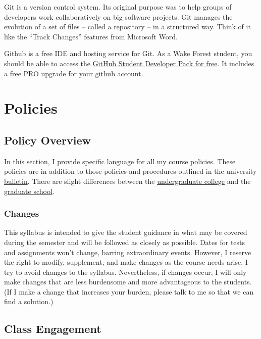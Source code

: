 Git is a version control system. Its original purpose was to help groups of developers work collaboratively on big software projects. Git manages the evolution of a set of files -- called a repository -- in a structured way. Think of it like the ``Track Changes'' features from Microsoft Word.

Github is a free IDE and hosting service for Git. As a Wake Forest student, you should be able to access the \href{https://education.github.com/benefits?type=student}{GitHub Student Developer Pack for free}. It includes a free PRO upgrade for your github account.

\hypertarget{part-policies}{%
\part*{Policies}\label{part-policies}}


\hypertarget{policy-overview}{%
\chapter{Policy Overview}\label{policy-overview}}

In this section, I provide specific language for all my course policies. These policies are in addition to those policies and procedures outlined in the university \href{https://bulletin.wfu.edu}{bulletin}. There are slight differences between the \href{https://bulletin.wfu.edu/undergraduate/}{undergraduate college} and the \href{https://bulletin.wfu.edu/graduate/}{graduate school}.

\hypertarget{changes}{%
\section{Changes}\label{changes}}

This syllabus is intended to give the student guidance in what may be covered during the semester and will be followed as closely as possible.
Dates for tests and assignments won't change, barring extraordinary events.
However, I reserve the right to modify, supplement, and make changes as the course needs arise.
I try to avoid changes to the syllabus.
Nevertheless, if changes occur, I will only make changes that are less burdensome and more advantageous to the students.
(If I make a change that increases your burden, please talk to me so that we can find a solution.)

\hypertarget{class-engagement}{%
\chapter{Class Engagement}\label{class-engagement}}

